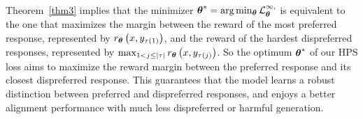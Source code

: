 Theorem~\ref{thm3} implies that the minimizer $ \boldsymbol{\theta}^{*} = \arg\min_{{\boldsymbol{\theta}}} \mathcal{L}_{{\boldsymbol{\theta}}}^{\infty,} $ is equivalent to  the one that maximizes the margin between the reward of the most preferred response, represented by $r_{{\boldsymbol{\theta}}}\left(x,y_{\tau(1)}\right)$, and the reward of the hardest dispreferred responses, represented by $\max_{1<j\leq |\tau|}r_{{\boldsymbol{\theta}}}\left(x,y_{\tau(j)}\right)$. So  the optimum  $\boldsymbol{\theta}^{*}$ of our HPS loss aims to maximize the reward margin between the preferred  response and its closest dispreferred response.  This guarantees that the model learns a robust distinction between preferred and dispreferred responses, and enjoys  a better alignment performance with much less dispreferred or harmful generation.

%
%


